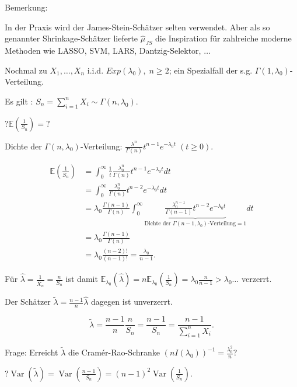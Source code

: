 \documentclass{tstextbook}
\DeclareMathOperator{\Var}{Var}
\newcommand{\E}{\mathbb E}
\begin{document}
	\begin{remark}
		Bemerkung: 
		
		In der Praxis wird der James-Stein-Schätzer selten verwendet. Aber als so genannter Shrinkage-Schätzer lieferte $ \hat{\mu}_{JS} $ die Inspiration für zahlreiche moderne Methoden wie LASSO, SVM, LARS, Dantzig-Selektor, $ \ldots $
	\end{remark}

\begin{example}
	Nochmal zu $ X_1,\ldots, X_n $ i.i.d. $ Exp(\lambda_0), \; n \ge 2 $; ein Spezialfall der s.g. $ \Gamma(1,\lambda_0) $-Verteilung. 
	
	Es gilt : $ S_n = \sum_{i=1}^{n}X_i \sim \Gamma(n,\lambda_0) $. 
	
	?$ \E\left(\frac{1}{S_n}\right)= ? $
	
	Dichte der $ \Gamma(n,\lambda_0) $-Verteilung: $ \frac{\lambda^n}{\Gamma(n)}t^{n-1}e^{-\lambda_0t} \; (t\ge0) $.
	
	\[
	\begin{aligned}
		\E\left(\frac{1}{S_n}\right) & = \int_{0}^{\infty}\frac{1}{t}\frac{\lambda_0^n}{\Gamma(n)}t^{n-1}e^{-\lambda_0t}dt \\
		& = \int_{0}^{\infty}\frac{\lambda_0^n}{\Gamma(n)}t^{n-2}e^{-\lambda_0t}dt \\
		& = \lambda_0 \frac{\Gamma(n-1)}{\Gamma(n)}\int_{0}^{\infty}\underbrace{\frac{\lambda_0^{n-1}}{\Gamma(n-1)}t^{n-2}e^{-\lambda_0 t}}_{\text{Dichte der }\Gamma(n-1,\lambda_0)\text{-Verteilung}=1}dt \\
		& = \lambda_0 \frac{\Gamma(n-1)}{\Gamma(n)} \\
		& = \lambda_0 \frac{(n-2)!}{(n-1)!} = \frac{\lambda_0}{n-1}.
	\end{aligned}
	\]
	
	Für $ \hat{\lambda} = \frac{1}{\bar{X}_n} = \frac{n}{S_n} $ ist damit $ \E_{\lambda_0}(\hat{\lambda}) = n\E_{\lambda_0}\left(\frac{1}{S_n}\right) = \lambda_0 \frac{n}{n-1} > \lambda_0 \ldots $ verzerrt.
	
	Der Schätzer $ \tilde{\lambda} = \frac{n-1}{n}\hat{\lambda} $ dagegen ist unverzerrt. 
	
	\[ \tilde{\lambda} = \frac{n-1}{n}\frac{n}{S_n} = \frac{n-1}{S_n} = \frac{n-1}{\sum_{i=1}^{n}X_i} . \] 
	
	Frage: Erreicht $ \tilde{\lambda} $ die Cramér-Rao-Schranke $ (nI(\lambda_0))^{-1} = \frac{\lambda_0^2}{n} $?
	
	?$ \Var(\tilde{\lambda}) = \Var\left(\frac{n-1}{S_n}\right) = (n-1)^2 \Var\left(\frac{1}{S_n}\right) $. 
	

\end{example}
\end{document}
